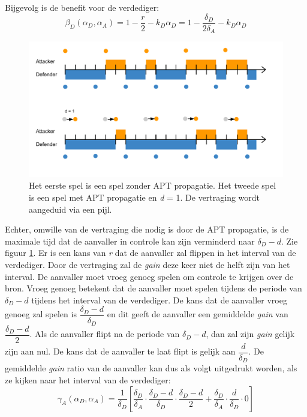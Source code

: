 \documentclass[master=cws, masteroption=vs,english]{kulemt}
\begin{document}
\begin{abstract*}
Bijgevolg is de benefit voor de verdediger:
\begin{equation}\label{first}
\beta_{D}(\alpha_{D},\alpha_{A}) =1 -  \dfrac {r} {2} - k_{D} \alpha_{D} = 1 - \dfrac {\delta_{D}} {2\delta_{A}} - k_{D} \alpha_{D} 
\end{equation}

\begin{figure}[hbtp]
\centering
\includegraphics[scale=0.5]{../../doc/template/Images/FLipItCase1.pdf}
\caption{Het eerste spel is een spel zonder APT propagatie. Het tweede spel is een spel met APT propagatie en \textit{d} = 1. De vertraging wordt aangeduid via een pijl.}
\label{fig:delaycase1}
\end{figure}


Echter, omwille van de vertraging die nodig is door de APT propagatie, is de maximale tijd dat de aanvaller in controle kan zijn verminderd naar $\delta_{D}-d$. Zie figuur \ref{fig:delaycase1}.  Er is een kans van \textit{r} dat de aanvaller zal flippen in het interval van de verdediger. Door de vertraging zal de \textit{gain} deze keer niet de helft zijn van het interval. De aanvaller moet vroeg genoeg spelen om controle te krijgen over de bron. Vroeg genoeg betekent dat de aanvaller moet spelen tijdens de periode van $\delta_{D}-d$ tijdens het interval van de verdediger. De kans dat de aanvaller vroeg genoeg zal spelen is $\dfrac{\delta_{D}-d}{\delta_{D}}$ en dit geeft de aanvaller een gemiddelde \textit{gain} van $\dfrac{\delta_{D}-d}{2}$. Als de aanvaller flipt na de periode van $\delta_{D}-d$, dan zal zijn \textit{gain} gelijk zijn aan nul. De kans dat de aanvaller te laat flipt is gelijk aan $\dfrac{d}{\delta_{D}}$. De gemiddelde \textit{gain} ratio van de aanvaller kan dus als volgt uitgedrukt worden, als ze kijken naar het interval van de verdediger:
\begin{equation}\label{first}
\gamma_{A}(\alpha_{D},\alpha_{A}) = \dfrac {1}{\delta_{D}} [ \dfrac{\delta_{D}}{\delta_{A}} \cdot \dfrac{\delta_{D}-d}{\delta_{D}} \cdot \dfrac{\delta_{D}-d}{2} + \dfrac{\delta_{D}}{\delta_{A}} \cdot \dfrac{d}{\delta_{D}} \cdot 0 ]
\end{equation}


\end{abstract*}
\end{document}
